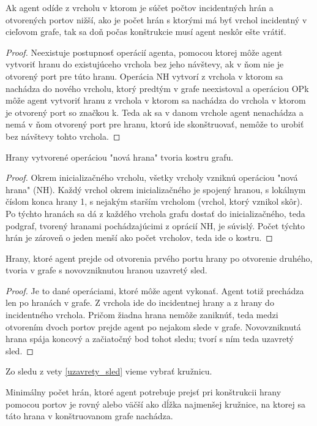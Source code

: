 \begin{lem}
Ak agent odíde z vrcholu v ktorom je súčet počtov incidentných hrán a
otvorených portov nižší, ako je počet hrán s ktorými má byť vrchol
incidentný v cieľovom grafe, tak sa doň počas konštrukcie musí agent neskôr
ešte vrátiť.
\end{lem}

\begin{proof}
Neexistuje postupnosť operácií agenta, pomocou ktorej môže agent vytvoriť
hranu do
existujúceho vrchola bez jeho návštevy, ak v ňom nie je otvorený port pre
túto hranu. Operácia NH vytvorí z vrchola v ktorom sa nachádza do nového
vrcholu, ktorý predtým v grafe neexistoval a operáciou OPk môže agent
vytvoriť hranu z vrchola v ktorom sa nachádza do vrchola v ktorom je
otvorený port so značkou k. Teda ak sa
v danom vrchole agent nenachádza a nemá v ňom otvorený port pre hranu,
ktorú ide skonštruovať, nemôže to urobiť bez návštevy tohto vrchola.
\end{proof}

\begin{lem}
Hrany vytvorené operáciou "nová hrana" tvoria kostru grafu.
\end{lem}
\begin{proof}
Okrem inicializačného vrcholu, všetky vrcholy vzniknú operáciou "nová hrana"
(NH). Každý vrchol okrem inicializačného je spojený hranou, s lokálnym číslom
konca hrany
1, s nejakým starším vrcholom (vrchol, ktorý vznikol skôr). Po týchto hranách 
sa dá
z každého vrchola grafu dostať do inicializačného, teda podgraf, 
tvorený hranami
pochádzajúcimi z oprácií NH, je súvislý. 
Počet týchto hrán je zároveň o jeden menší ako počet
vrcholov, teda ide o kostru.
\end{proof}

\begin{lem}
\label{uzavrety_sled}
Hrany, ktoré agent prejde od otvorenia prvého portu hrany po otvorenie druhého,
tvoria v grafe s novovzniknutou hranou uzavretý sled.
\end{lem}
\begin{proof}
Je to dané operáciami, ktoré môže agent vykonať. Agent totiž prechádza len
po hranách v grafe. Z vrchola ide do incidentnej hrany a z hrany do
incidentného vrchola. Pričom žiadna hrana nemôže zaniknúť, teda medzi otvorením
dvoch portov prejde agent po nejakom slede v grafe. Novovzniknutá hrana
spája koncový a začiatočný bod tohot sledu; tvorí s ním teda uzavretý sled.
\end{proof}
\begin{pozn}
Zo sledu z vety \ref{uzavrety_sled} vieme vybrať kružnicu.
\end{pozn}
\begin{lem}
\label{minimum}
Minimálny počet hrán, ktoré agent potrebuje prejsť pri konštrukcii 
hrany pomocou
portov je rovný alebo väčší ako dĺžka najmenšej kružnice, na ktorej sa táto
hrana v konštruovanom grafe nachádza.
\end{lem}

